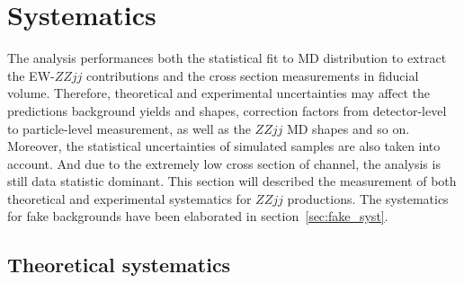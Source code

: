 \section{Systematics}
\label{sec:systematics}

The analysis performances both the statistical fit to MD distribution to extract the EW-$ZZjj$ contributions
and the cross section measurements in fiducial volume.
Therefore, theoretical and experimental uncertainties may affect the predictions background yields and shapes, 
correction factors from detector-level to particle-level measurement, as well as the $ZZjj$ MD shapes and so on.
Moreover, the statistical uncertainties of simulated samples are also taken into account.
And due to the extremely low cross section of \llll channel, the analysis is still data statistic dominant.
This section will described the measurement of both theoretical and experimental systematics for $ZZjj$ productions.
The systematics for fake backgrounds have been elaborated in section~\ref{sec:fake_syst}.

\subsection{Theoretical systematics}

